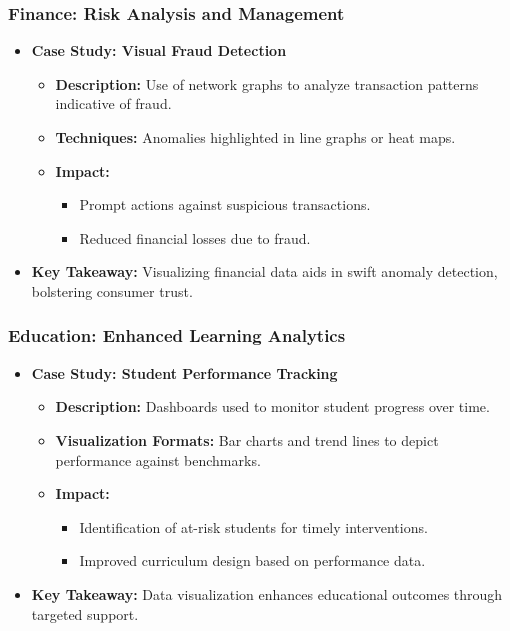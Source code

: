 \documentclass[aspectratio=169]{beamer}
\begin{document}
\begin{frame}[fragile]
    \frametitle{Finance: Risk Analysis and Management}
    \begin{itemize}
        \item \textbf{Case Study: Visual Fraud Detection}
        \begin{itemize}
            \item \textbf{Description:} Use of network graphs to analyze transaction patterns indicative of fraud.
            \item \textbf{Techniques:} Anomalies highlighted in line graphs or heat maps.
            \item \textbf{Impact:}
            \begin{itemize}
                \item Prompt actions against suspicious transactions.
                \item Reduced financial losses due to fraud.
            \end{itemize}
        \end{itemize}
        \item \textbf{Key Takeaway:} Visualizing financial data aids in swift anomaly detection, bolstering consumer trust.
    \end{itemize}
\end{frame}

\begin{frame}[fragile]
    \frametitle{Education: Enhanced Learning Analytics}
    \begin{itemize}
        \item \textbf{Case Study: Student Performance Tracking}
        \begin{itemize}
            \item \textbf{Description:} Dashboards used to monitor student progress over time.
            \item \textbf{Visualization Formats:} Bar charts and trend lines to depict performance against benchmarks.
            \item \textbf{Impact:}
            \begin{itemize}
                \item Identification of at-risk students for timely interventions.
                \item Improved curriculum design based on performance data.
            \end{itemize}
        \end{itemize}
        \item \textbf{Key Takeaway:} Data visualization enhances educational outcomes through targeted support.
    \end{itemize}
\end{frame}
\end{document}
